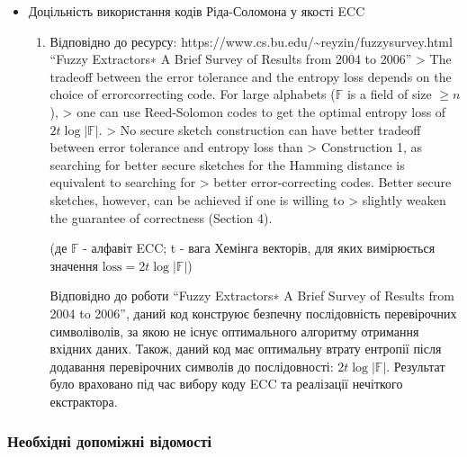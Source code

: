 \documentclass[11pt]{article}
\providecommand{\tightlist}{%
      \setlength{\itemsep}{0pt}\setlength{\parskip}{0pt}}
\begin{document}
\begin{itemize}
\tightlist
\item
  Доцільність використання кодів Ріда-Соломона у якості ECC

  \begin{enumerate}
  \def\labelenumi{\arabic{enumi}.}
  \item
    Відповідно до ресурсу:
    https://www.cs.bu.edu/\textasciitilde reyzin/fuzzysurvey.html
    ``Fuzzy Extractors∗ A Brief Survey of Results from 2004 to 2006''
    \textgreater{} The tradeoff between the error tolerance and the
    entropy loss depends on the choice of errorcorrecting code. For
    large alphabets (\(\mathbb{F}\) is a field of size \(\geq n\)),
    \textgreater{} one can use Reed-Solomon codes to get the optimal
    entropy loss of \(2t\log{|\mathbb{F}|}\). \textgreater{} No secure
    sketch construction can have better tradeoff between error tolerance
    and entropy loss than \textgreater{} Construction 1, as searching
    for better secure sketches for the Hamming distance is equivalent to
    searching for \textgreater{} better error-correcting codes. Better
    secure sketches, however, can be achieved if one is willing to
    \textgreater{} slightly weaken the guarantee of correctness (Section
    4).

    (де \(\mathbb{F}\) - алфавіт ECC; t - вага Хемінга векторів, для
    яких вимірюється значення \(\text{loss} = 2t\log{|\mathbb{F}|}\))

    Відповідно до роботи ``Fuzzy Extractors∗ A Brief Survey of Results
    from 2004 to 2006'', даний код конструює безпечну послідовність
    перевірочних символіволів, за якою не існує оптимального алгоритму
    отримання вхідних даних. Також, даний код має оптимальну втрату
    ентропії після додавання перевірочних символів до послідовності:
    \(2t\log{|\mathbb{F}|}\). Результат було враховано під час вибору
    коду ECC та реалізації нечіткого екстрактора.
  \end{enumerate}
\end{itemize}

    \hypertarget{ux43dux435ux43eux431ux445ux456ux434ux43dux456-ux434ux43eux43fux43eux43cux456ux436ux43dux456-ux432ux456ux434ux43eux43cux43eux441ux442ux456}{%
\subsubsection{Необхідні допоміжні
відомості}\label{ux43dux435ux43eux431ux445ux456ux434ux43dux456-ux434ux43eux43fux43eux43cux456ux436ux43dux456-ux432ux456ux434ux43eux43cux43eux441ux442ux456}}
\end{document}
